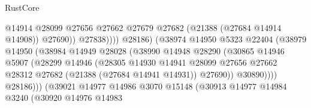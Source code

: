 \begin{lexlean}{RustCore}
\begin{coremodule}
                                                  @14914
                                                  @28099
                                                  @27656
                                                  @27662
                                                  @27679
                                                  @27682
                                                  (@21388 (@27684 @14914 @14908))
                                                  @27690))
                                              @27838))))
                                      @28186)
                                    (@38974
                                      @14950
                                      @5323
                                      @22404
                                      (@38979
                                        @14950
                                        (@38984
                                          @14949
                                          @28028
                                          (@38990
                                            @14948
                                            @28290
                                            (@30865
                                              @14946
                                              @5907
                                              (@28299
                                                @14946
                                                (@28305
                                                  @14930
                                                  @14941
                                                  @28099
                                                  @27656
                                                  @27662
                                                  @28312
                                                  @27682
                                                  (@21388 (@27684 @14941 @14931))
                                                  @27690))
                                              @30890))))
                                      @28186)))
                                (@39021
                                  @14977
                                  @14986
                                  @3070
                                  @15148
                                  (@30913
                                    @14977
                                    @14984
                                    @3240
                                    (@30920
                                      @14976
                                      @14983

\end{coremodule}
\end{lexlean}
